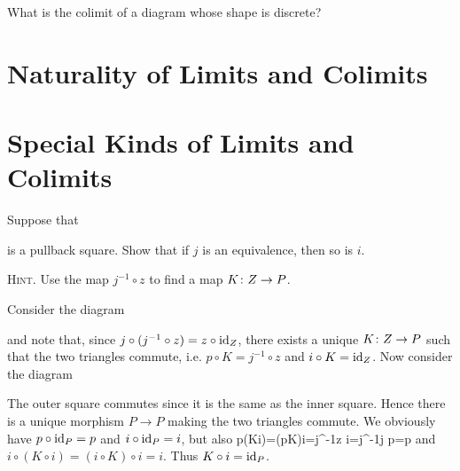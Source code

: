 \bs
\es

\bx
What is the colimit of a diagram whose shape is discrete?
\ex

\bs
\es



\section{Naturality of Limits and Colimits}

\section{Special Kinds of Limits and Colimits}

\bp
Suppose that
\bse
{}
\ese
is a pullback square. Show that if $j$ is an equivalence, then so is $i$.

{\scshape Hint}. Use the map $j^{-1}\circ z$ to find a map $K\colon Z\to P$.
\ep

\bs
Consider the diagram
\bse
{}
\ese
and note that, since $j\circ(j^{-1}\circ z)=z\circ \mathrm{id}_Z$, there exists a unique $K\colon Z\to P$ such that the two triangles commute, i.e. $p\circ K=j^{-1}\circ z$ and $i\circ K=\mathrm{id}_Z$. Now consider the diagram
\bse
{}
\ese
The outer square commutes since it is the same as the inner square. Hence there is a unique morphism $P\to P$ making the two triangles commute. We obviously have $p\circ \mathrm{id}_P=p$ and $i\circ \mathrm{id}_P=i$, but also
\bse
p\circ(K\circ i)=(p\circ K)\circ i=j^{-1}\circ z \circ i=j^{-1}\circ j \circ p=p
\ese
and $i\circ(K\circ i)=(i\circ K)\circ i=i$. Thus $K\circ i=\mathrm{id}_P$.
\es

